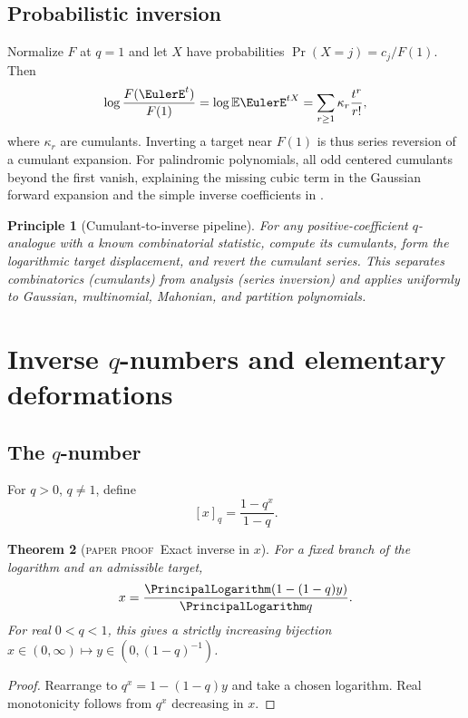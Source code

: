 \documentclass[11pt,oneside]{article}
\newtheorem{theorem}{Theorem}[section]
\theoremstyle{definition}
\theoremstyle{remark}
\theoremstyle{plain}
\newtheorem{principle}[theorem]{Principle}
\theoremstyle{definition}
\theoremstyle{remark}
\newcommand{\statusproved}{\textcolor{provedgreen}{\textsc{paper proof}}}
\numberwithin{equation}{section}
\numberwithin{figure}{section}
\numberwithin{table}{section}
\let\reporttopsection\section
\let\reportsubsection\subsection
\let\reportsubsubsection\subsubsection
\let\chapter\reporttopsection
\let\section\reportsubsection
\let\subsection\reportsubsubsection
\begin{document}
\section{Probabilistic inversion}
Normalize \(F\) at \(q=1\) and let \(X\) have probabilities
\(\Pr(X=j)=c_j/F(1)\).  Then
\[
 \log\frac{F(\EulerE^t)}{F(1)}
 =\log\mathbb E\EulerE^{tX}
 =\sum_{r\ge1}\kappa_r\frac{t^r}{r!},
\]
where \(\kappa_r\) are cumulants.  Inverting a target near \(F(1)\) is thus
series reversion of a cumulant expansion.  For palindromic polynomials, all odd
centered cumulants beyond the first vanish, explaining the missing cubic term
in the Gaussian forward expansion and the simple inverse coefficients in
.

\begin{principle}[Cumulant-to-inverse pipeline]
For any positive-coefficient \(q\)-analogue with a known combinatorial
statistic, compute its cumulants, form the logarithmic target displacement, and
revert the cumulant series.  This separates combinatorics (cumulants) from
analysis (series inversion) and applies uniformly to Gaussian, multinomial,
Mahonian, and partition polynomials.
\end{principle}

\chapter{Inverse \texorpdfstring{\(q\)}{q}-numbers and elementary deformations}

\section{The \texorpdfstring{\(q\)}{q}-number}
For \(q>0\), \(q\ne1\), define
\[
 [x]_q=\frac{1-q^x}{1-q}.
\]

\begin{theorem}[\statusproved\ Exact inverse in \(x\)]
For a fixed branch of the logarithm and an admissible target,
\begin{equation}
 x=\frac{\PrincipalLogarithm(1-(1-q)y)}{\PrincipalLogarithm q}.
 \label{eq:qnumber-inverse-x}
\end{equation}
For real \(0<q<1\), this gives a strictly increasing bijection
\(x\in(0,\infty)\mapsto y\in(0,(1-q)^{-1})\).
\end{theorem}
\begin{proof}
Rearrange to \(q^x=1-(1-q)y\) and take a chosen logarithm.  Real monotonicity
follows from \(q^x\) decreasing in \(x\).
\end{proof}
\end{document}
